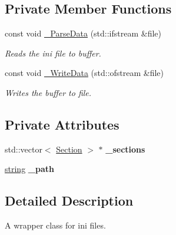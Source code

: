 \subsection*{Private Member Functions}
\begin{DoxyCompactItemize}
\item 
const void \hyperlink{class_ensum_1_1_file_handler_1_1ini_a413fd1029742025232f53d3020280245}{\+\_\+\+Parse\+Data} (std\+::ifstream \&file)
\begin{DoxyCompactList}\small\item\em Reads the ini file to buffer. \end{DoxyCompactList}\item 
const void \hyperlink{class_ensum_1_1_file_handler_1_1ini_ace94f563974a671c5249548934688c88}{\+\_\+\+Write\+Data} (std\+::ofstream \&file)\hypertarget{class_ensum_1_1_file_handler_1_1ini_ace94f563974a671c5249548934688c88}{}\label{class_ensum_1_1_file_handler_1_1ini_ace94f563974a671c5249548934688c88}

\begin{DoxyCompactList}\small\item\em Writes the buffer to file. \end{DoxyCompactList}\end{DoxyCompactItemize}
\subsection*{Private Attributes}
\begin{DoxyCompactItemize}
\item 
std\+::vector$<$ \hyperlink{struct_ensum_1_1_file_handler_1_1ini_1_1_section}{Section} $>$ $\ast$ {\bfseries \+\_\+sections}\hypertarget{class_ensum_1_1_file_handler_1_1ini_a3088b323acff5e13750fb5d9242b2f91}{}\label{class_ensum_1_1_file_handler_1_1ini_a3088b323acff5e13750fb5d9242b2f91}

\item 
\hyperlink{class_ensum_1_1string}{string} {\bfseries \+\_\+path}\hypertarget{class_ensum_1_1_file_handler_1_1ini_a3d544c876f6837be6ca027db706cbba6}{}\label{class_ensum_1_1_file_handler_1_1ini_a3d544c876f6837be6ca027db706cbba6}

\end{DoxyCompactItemize}


\subsection{Detailed Description}
A wrapper class for ini files. 

